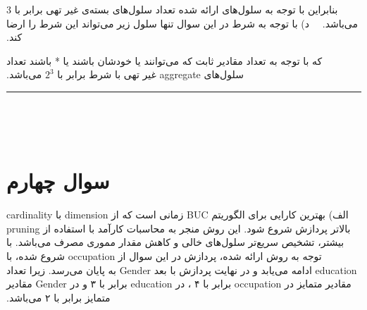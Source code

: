 ‫
‫بنابراین با توجه به سلول‌های ارائه شده تعداد سلول‌های بسته‌ی غیر تهی برابر با \colorbox{Emerald}{3} می‌باشد.
‫
‫‫‫\vspace{1cm}
‫
‫د) با توجه به شرط  در این سوال تنها سلول زیر می‌تواند این شرط را ارضا کند. 
\begin{center}
\end{center}
‫که با توجه به تعداد مقادیر ثابت که می‌توانند یا خودشان باشند یا * باشند تعداد سلول‌های aggregate غیر تهی با شرط  برابر با \colorbox{Emerald}{\(2^3\)} می‌باشد.
‫
‫‫\vspace{1cm}
‫
‫\hrule height .4 pt depth 0 pt width 16 cm \relax
‫
‫‫%

‫\section{سوال چهارم}

‫الف) بهترین کارایی برای الگوریتم BUC زمانی است که از dimension با cardinality بالاتر پردازش شروع شود. این روش منجر به محاسبات کارآمد با استفاده از pruning بیشتر، تشخیص سریع‌تر سلول‌‌های خالی و کاهش مقدار مموری مصرف می‌باشد. \newline
‫با توجه به روش ارائه شده، پردازش در این سوال از occupation شروع شده، با education ادامه می‌یابد و در نهایت پردازش با بعد Gender به پایان می‌رسد. زیرا تعداد مقادیر متمایز در occupation برابر با ۴ ، در education برابر با ۳ و در Gender مقادیر متمایز برابر با ۲ می‌باشد.


